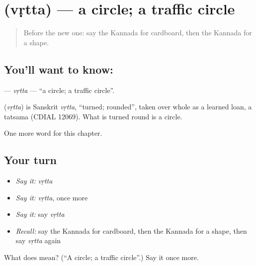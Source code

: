 \section[\texorpdfstring{\kn{ವೃತ್ತ} (vṛtta)}{ವೃತ್ತ (vṛtta)}]{ (vṛtta) — a circle; a traffic circle}

\label{lesson:KA-C193-vrtta}



\begin{quote}
Before the new one: say the Kannada for cardboard, then the Kannada for a shape.
\end{quote}

\subsection*{You'll want to know: }
\textbf{} — \emph{vṛtta} — \textquotedblleft{}a circle; a traffic circle\textquotedblright{}.

\begin{cousinweb}
\textbf{} (\emph{vṛtta}) is Sanskrit \emph{vṛtta}, \textquotedblleft{}turned; rounded\textquotedblright{}, taken over whole as a learned loan, a tatsama (CDIAL 12069). What is turned round is a circle.
\end{cousinweb}

\begin{grammarlens}[title={What you've built}]
One more word for this chapter.
\end{grammarlens}

\subsection*{Your turn}
\begin{itemize}
\raggedright
  \item \emph{Say it:} \emph{vṛtta}
  \item \emph{Say it:} \emph{vṛtta}, once more
  \item \emph{Say it:} say \emph{vṛtta}
  \item \emph{Recall:} say the Kannada for cardboard, then the Kannada for a shape, then say \emph{vṛtta} again
\end{itemize}

\begin{tcolorbox}[breakable,colback=teal!4,colframe=teal!35!black,title={Before you move on}]
What does  mean? (\textquotedblleft{}A circle; a traffic circle\textquotedblright{}.) Say it once more.
\end{tcolorbox}

